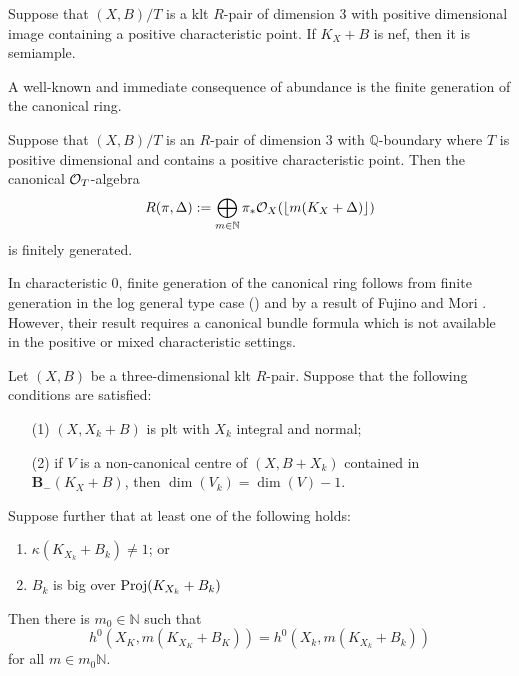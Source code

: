 	\begin{theorem}\label{Main_Abund1}
		Suppose that $(X,B)/T$ is a klt $R$-pair of dimension $3$ with positive dimensional image containing a positive characteristic point.
		If $K_X+B$ is nef, then it is semiample.
	\end{theorem}

	A well-known and immediate consequence of abundance is the finite generation of the canonical ring.
	
	\begin{theorem}
		Suppose that $(X,B)/T$ is an $R$-pair of dimension $3$ with $\mathbb{Q}$-boundary where $T$ is positive dimensional and contains a positive characteristic point. 
		Then the canonical $\ox[T]$-algebra
		\[R(\pi,\Delta):=\bigoplus_{m \in \mathbb{N}} \pi_{*}\ox(\lfloor m(K_{X}+\Delta)\rfloor)\]
		is finitely generated.
	\end{theorem}

	In characteristic $0$, finite generation of the canonical ring follows from finite generation in the log general type case (\cite{BCHM10}) and by a result of Fujino and Mori \cite[Theorem 5.2]{FM00}. However, their result requires a canonical bundle formula which is not available in the positive or mixed characteristic settings.


	\begin{theorem}\label{Main_Abund2}
		Let $(X,B)$ be a three-dimensional klt $R$-pair. Suppose that the following conditions are satisfied:
		\begin{enumerate}
		\item[(1)] $(X,X_{k}+B)$ is plt with $X_k$ integral and normal;
		\item[(2)] if $V$ is a non-canonical centre of $(X,B+X_k)$ contained in ${\mathbf{B}_{-}(K_{X}+B)}$, then $\dim (V_{k})=\dim (V) -1$.
		\end{enumerate}
		Suppose further that at least one of the following holds:
		\begin{enumerate}
			\item $\kappa(K_{X_{k}}+B_{k}) \neq 1$; or
			\item $B_{k}$ is big over $\textup{Proj}(K_{X_{k}}+B_{k})$
		\end{enumerate}	
		Then there is $m_{0} \in \mathbb{N}$ such that 
		$$h^{0}(X_{K},m(K_{X_{K}}+B_{K}))=h^{0}(X_{k},m(K_{X_{k}}+B_{k}))$$
		for all $m \in m_{0}\mathbb{N}$.
		
	\end{theorem}

